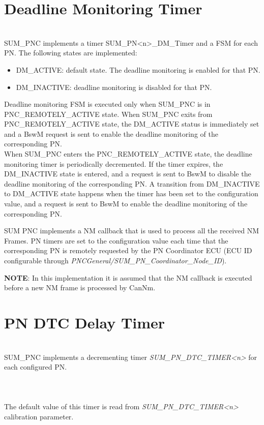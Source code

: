 
 

\section{Deadline Monitoring Timer}
\\
SUM_PNC implements a timer SUM_PN<n>_DM_Timer and a FSM for each PN.
The following states are implemented:

\begin{itemize}
	\item DM_ACTIVE: default state. The deadline monitoring is enabled for that PN.
	\item DM_INACTIVE: deadline monitoring is disabled for that PN.
\end{itemize}

Deadline monitoring FSM is executed only when SUM_PNC is in PNC_REMOTELY_ACTIVE state.
When SUM_PNC exits from PNC_REMOTELY_ACTIVE state, the DM_ACTIVE status is immediately set and a BswM request is sent to enable the deadline monitoring of the corresponding PN. 
\\
When SUM_PNC enters the PNC_REMOTELY_ACTIVE state, the deadline monitoring timer is periodically decremented. If the timer expires, the DM_INACTIVE state is entered, and a request is sent to BswM to disable the deadline monitoring of the corresponding PN.
A transition from DM_INACTIVE to DM_ACTIVE state happens when the timer has been set to the configuration value, and a request is sent to BswM to enable the deadline monitoring of the corresponding PN.

SUM PNC implements a NM callback that is used to process all the received NM Frames.
PN timers are set to the configuration value each time that the corresponding PN is remotely requested by the PN Coordinator ECU (ECU ID configurable through \textit{PNCGeneral/SUM_PN_Coordinator_Node_ID}). 

\textbf{NOTE}: In this implementation it is assumed that the NM callback is executed before a new NM frame is processed by CanNm.


\section{PN DTC Delay Timer}
\label{sec:PNDTCDelayTimer}
\\
SUM_PNC implements a decrementing timer \textit{SUM_PN_DTC_TIMER<n>} for each configured PN.
\\
  
\\
\\
\\
The default value of this timer is read from \textit{SUM_PN_DTC_TIMER<n>} calibration parameter.

